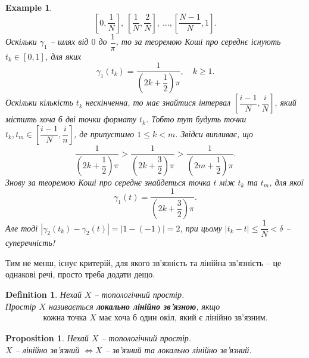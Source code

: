 \documentclass[a4paper, 10pt]{article}
\theoremstyle{theoremdd}
\newtheorem{definition}[theorem]{Definition}
\newtheorem{example}[theorem]{Example}
\newtheorem{proposition}[theorem]{Proposition}
\begin{document}
\begin{example}
\[
\left[0, \dfrac{1}{N} \right],\ \left[\dfrac{1}{N}, \dfrac{2}{N} \right],\ \dots, \left[ \dfrac{N-1}{N}, 1 \right].
\]
Оскільки $\gamma_1$ -- шлях від $0$ до $\dfrac{1}{\pi}$, то за теоремою Коші про середнє існують $t_k \in [0,1]$, для яких 
\[
\gamma_1(t_k) = \dfrac{1}{\left( 2k + \dfrac{1}{2} \right)\pi},\quad k \geq 1.
\]
Оскільки кількість $t_k$ нескінченна, то має знайтися інтервал $\left[ \dfrac{i-1}{N}, \dfrac{i}{N} \right]$, який містить хоча б дві точки формату $t_k$. Тобто тут будуть точки $t_k, t_m \in \left[ \dfrac{i-1}{N}, \dfrac{i}{n} \right]$, де припустимо $1 \leq k < m$. Звідси випливає, що 
\[
\dfrac{1}{\left( 2k + \dfrac{1}{2} \right) \pi} > \dfrac{1}{\left( 2k + \dfrac{3}{2} \right) \pi} > \dfrac{1}{\left( 2m + \dfrac{1}{2} \right) \pi}.
\]
Знову за теоремою Коші про середнє знайдеться точка $t$ між $t_k$ та $t_m$, для якої \[
\gamma_1(t) = \dfrac{1}{\left( 2k + \dfrac{3}{2}\right)\pi}.
\] 
Але тоді $\left| \gamma_2(t_k) - \gamma_2(t) \right| = |1-(-1)| = 2$, при цьому $|t_k-t| \leq \dfrac{1}{N} < \delta$ -- суперечність!
\end{example}

\noindent Тим не менш, існує критерій, для якого зв'язність та лінійна зв'язність -- це однакові речі, просто треба додати дещо.

\begin{definition}
Нехай $X$ -- топологічний простір.\\
Простір $X$ називається \textbf{локально лінійно зв'язною}, якщо
\begin{align*}
\text{кожна точка $X$ має хоча б один окіл, який є лінійно зв'язним.}
\end{align*}
\end{definition}

\begin{proposition}
Нехай $X$ -- топологічний простір.\\
$X$ -- лінійно зв'язний $\iff X$ -- зв'язний та локально лінійно зв'язний.
\end{proposition}
\end{document}
